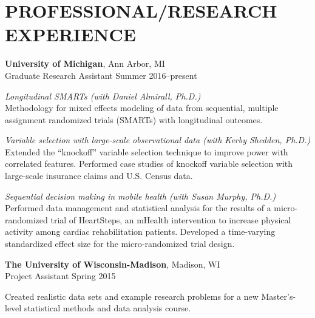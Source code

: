 \documentclass[letterpaper, 11pt]{article}
\begin{document}
\section{PROFESSIONAL/RESEARCH EXPERIENCE}

{\bf University of Michigan}, Ann Arbor, MI\\
Graduate Research Assistant \hfill Summer 2016--present

{\addtolength{\leftskip}{15pt}\textit{Longitudinal SMARTs (with Daniel Almirall, Ph.D.)}\\%
Methodology for mixed effects modeling of data from sequential, multiple assignment randomized trials (SMARTs) with longitudinal outcomes. %

}

{\addtolength{\leftskip}{15pt}\textit{Variable selection with large-scale observational data (with Kerby Shedden, Ph.D.)}\\%
Extended the ``knockoff'' variable selection technique to improve power with correlated features.
Performed case studies of knockoff variable selection with large-scale insurance claims and U.S. Census data.

}

{\addtolength{\leftskip}{15pt} \textit{Sequential decision making in mobile health (with Susan Murphy, Ph.D.)}\\%
Performed data management and statistical analysis for the results of a micro-randomized trial of HeartSteps, an mHealth intervention to increase  physical activity among cardiac rehabilitation patients. Developed a time-varying standardized effect size for the micro-randomized trial design. 

}

{\bf The University of Wisconsin-Madison}, Madison, WI\\
Project Assistant \hfill Spring 2015

{\addtolength{\leftskip}{15pt}
 Created realistic data sets and example research problems for a new Master's-level
  statistical methods and data analysis course.

}
\end{document}
